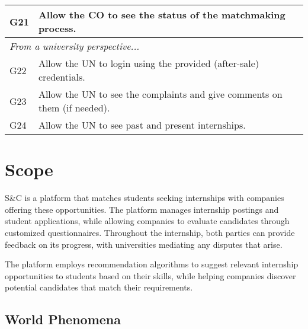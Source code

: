 \begin{table}[H]
\begin{longtable}{|l|p{}|}
        \hline
        G21           & Allow the CO to see the status of the matchmaking process.                                                                                        \\
        \hline \hline
        \multicolumn{2}{|l|}{\textit{From a university perspective...}}                                                                                                   \\
        \hline
        G22           & Allow the UN to login using the provided (after-sale) credentials.                                                                                \\
        \hline
        G23           & Allow the UN to see the complaints and give comments on them (if needed).                                                                         \\
        \hline
        G24           & Allow the UN to see past and present internships.                                                                                                 \\
        \hline
    \end{longtable}
\end{table}

\section{Scope}
\label{sec:scope}%

\par S\&C is a platform that matches students seeking internships with companies offering these opportunities. The
platform manages internship postings and student applications, while allowing companies to evaluate candidates through
customized questionnaires. Throughout the internship, both parties can provide feedback on its progress, with
universities mediating any disputes that arise.

\par The platform employs recommendation algorithms to suggest relevant internship opportunities to students based on
their skills, while helping companies discover potential candidates that match their requirements.

\subsection{World Phenomena}
\label{subsec:world-phenomena}%

